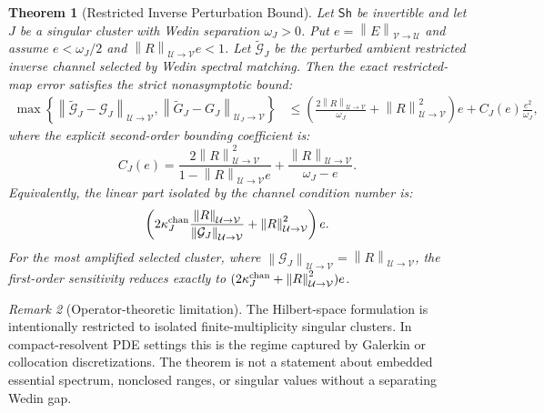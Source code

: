 \documentclass[review]{siamart220329}
\newtheorem{theorem}{Theorem}[section]
\theoremstyle{definition}
\theoremstyle{remark}
\newtheorem{remark}[theorem]{Remark}
\newcommand{\calU}{\mathcal{U}}
\newcommand{\calV}{\mathcal{V}}
\newcommand{\Sh}{\mathsf{Sh}}
\newcommand{\norm}[1]{\left\lVert #1\right\rVert}
\begin{document}
\begin{theorem}[Restricted Inverse Perturbation Bound]
\label{thm:channel-conditioned-stability}
Let $\Sh$ be invertible and let $J$ be a singular cluster with Wedin separation $\omega_J>0$. Put $e=\norm{E}_{\calV\to\calU}$ and assume $e<\omega_J/2$ and $\norm{R}_{\calU\to\calV}e<1$. Let $\widetilde{\mathcal G}_J$ be the perturbed ambient restricted inverse channel selected by Wedin spectral matching. Then the exact restricted-map error satisfies the strict nonasymptotic bound:
\begin{align}
    \max\left\{
    \norm{\widetilde{\mathcal G}_J-\mathcal G_J}_{\calU\to\calV},
    \norm{\widetilde G_J-G_J}_{\calU_J\to\calV}
    \right\}
    &\leq
    \left(\frac{2\norm{R}_{\calU\to\calV}}{\omega_J}+\norm{R}_{\calU\to\calV}^2\right)e
    +C_J(e)\frac{e^2}{\omega_J},
    \label{eq:channel-conditioned-bound-explicit}
\end{align}
where the explicit second-order bounding coefficient is:
\begin{equation}
    C_J(e)=\frac{2\norm{R}_{\calU\to\calV}^2}{1-\norm{R}_{\calU\to\calV}e}
    +\frac{\norm{R}_{\calU\to\calV}}{\omega_J-e}.
    \label{eq:channel-second-order-constant}
\end{equation}
Equivalently, the linear part isolated by the channel condition number is:
\begin{equation}
    \left(
        2\kappa_J^{\rm chan}\frac{\norm{R}_{\calU\to\calV}}{\norm{\mathcal G_J}_{\calU\to\calV}}
        +\norm{R}_{\calU\to\calV}^2
    \right)e.
    \label{eq:channel-conditioned-bound}
\end{equation}
For the most amplified selected cluster, where $\norm{\mathcal G_J}_{\calU\to\calV}=\norm{R}_{\calU\to\calV}$, the first-order sensitivity reduces exactly to $(2\kappa_J^{\rm chan}+\norm{R}_{\calU\to\calV}^2)e$.
\end{theorem}
\begin{remark}[Operator-theoretic limitation]
The Hilbert-space formulation is intentionally restricted to isolated finite-multiplicity singular clusters. In compact-resolvent PDE settings this is the regime captured by Galerkin or collocation discretizations. The theorem is not a statement about embedded essential spectrum, nonclosed ranges, or singular values without a separating Wedin gap.
\end{remark}
\end{document}

